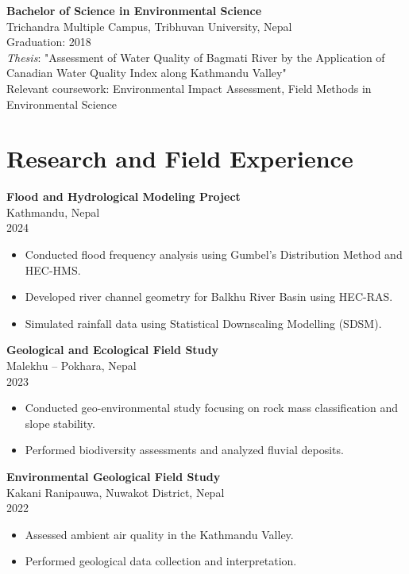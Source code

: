 \documentclass[a4paper,10pt]{article}
\begin{document}
\noindent
\textbf{Bachelor of Science in Environmental Science} \\
Trichandra Multiple Campus, Tribhuvan University, Nepal \\
Graduation: 2018 \\
\textit{Thesis}: "Assessment of Water Quality of Bagmati River by the Application of Canadian Water Quality Index along Kathmandu Valley" \\
Relevant coursework: Environmental Impact Assessment, Field Methods in Environmental Science

\vspace{0.3cm}

\section*{Research and Field Experience}
\noindent
\textbf{Flood and Hydrological Modeling Project} \\
Kathmandu, Nepal \\
2024 \\
\begin{itemize}[noitemsep]
    \item Conducted flood frequency analysis using Gumbel’s Distribution Method and HEC-HMS.
    \item Developed river channel geometry for Balkhu River Basin using HEC-RAS.
    \item Simulated rainfall data using Statistical Downscaling Modelling (SDSM).
\end{itemize}

\vspace{0.2cm}

\noindent
\textbf{Geological and Ecological Field Study} \\
Malekhu – Pokhara, Nepal \\
2023 \\
\begin{itemize}[noitemsep]
    \item Conducted geo-environmental study focusing on rock mass classification and slope stability.
    \item Performed biodiversity assessments and analyzed fluvial deposits.
\end{itemize}

\vspace{0.2cm}

\noindent
\textbf{Environmental Geological Field Study} \\
Kakani Ranipauwa, Nuwakot District, Nepal \\
2022 \\
\begin{itemize}[noitemsep]
    \item Assessed ambient air quality in the Kathmandu Valley.
    \item Performed geological data collection and interpretation.
\end{itemize}
\end{document}
